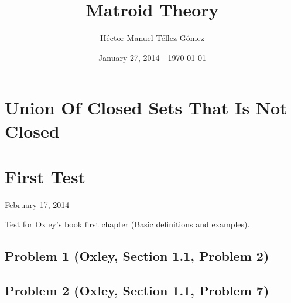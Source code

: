 \frontmatter
\title{Matroid Theory}
\author{Héctor Manuel Téllez Gómez}
\date{January 27, 2014 - \today}
\maketitle

\tableofcontents

\mainmatter


\chapter{Union Of Closed Sets That Is Not Closed}


\chapter{First Test}
    \begin{center} February 17, 2014 \end{center}
    Test for Oxley's book first chapter (Basic definitions and examples). 
    \section{Problem 1 (Oxley, Section 1.1, Problem 2)}
    
    \section{Problem 2 (Oxley, Section 1.1, Problem 7)}    
    
